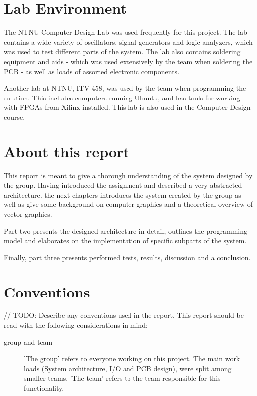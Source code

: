 \section{Lab Environment}
The NTNU Computer Design Lab was used frequently for this project. The lab contains a wide variety of oscillators, signal generators and logic analyzers, which was used to test different parts of the system. The lab also contains soldering equipment and aids - which was used extensively by the team when soldering the PCB - as well as loads of assorted electronic components.

Another lab at NTNU, ITV-458, was used by the team when programming the solution. This includes computers running Ubuntu, and has tools for working with FPGAs from Xilinx installed. This lab is also used in the Computer Design course.

\section{About this report}
This report is meant to give a thorough understanding of the system designed by the group.
Having introduced the assignment and described a very abstracted architecture, the next chapters introduces the system created by the group as well as give some background on computer graphics and a theoretical overview of vector graphics.

Part two presents the designed architecture in detail, outlines the programming model and elaborates on the implementation of specific subparts of the system.

Finally, part three presents performed tests, results, discussion and a conclusion.

\section{Conventions}
// TODO: Describe any conventions used in the report.
This report should be read with the following considerations in mind:

\begin{description}
    \item[group and team] 'The group' refers to everyone working on this project. The main work loads (System architecture, I/O and PCB design), were split among smaller teams. 'The team' refers to the team responsible for this functionality.
\end{description}
